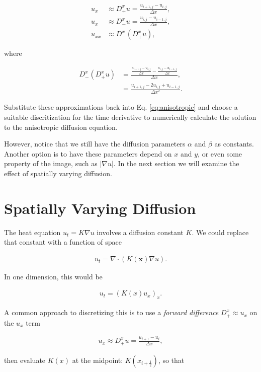 \documentclass[11pt,a4paper,noindent]{article}
\begin{document}
\begin{align}
u_x &\approx D_+^x u = \frac{u_{i+1,j}-u_{i,j}}{\Delta x}, \\
u_x &\approx D_-^x u = \frac{u_{i,j}-u_{i-1,j}}{\Delta x}, \\
u_{xx} &\approx D_-^x (D_+^x u), 
\end{align}

where 

\begin{align}
 D_-^x (D_+^x u) &= \frac{\frac{u_{i+1,j}-u_{i,j}}{\Delta x} - \frac{u_{i,j}-u_{i-1,j}}{\Delta x}}{\Delta x}, \\
 &= \frac{u_{i+1,j}-2u_{i,j} +u_{i-1,j}}{\Delta x^2}.
\end{align}

Substitute these approximations back into Eq. \ref{eq:anisotropic} and choose a suitable discritization for the time derivative to numerically calculate the solution to the anisotropic diffusion equation.

However, notice that we still have the diffusion parameters $\alpha$ and $\beta$ as constants. Another option is to have these parameters depend on $x$ and $y$, or even some property of the image, such as $|\nabla u|$. In the next section we will examine the effect of spatially varying diffusion.

\section{Spatially Varying Diffusion}

The heat equation $u_t = K \nabla u$ involves a diffusion constant $K$. We could replace that constant with a function of space

\begin{align}
u_t = \nabla \cdot (K(\mathbf{x}) \nabla u).
\end{align}

In one dimension, this would be

\begin{align}
u_t = (K(x) u_x)_x.
\end{align}

A common approach to discretizing this is to use a \emph{forward difference} $D_+^x \approx u_x$ on the $u_x$ term

\begin{align}
u_x \approx D_+^x u = \frac{u_{i+1}-u_{i}}{\Delta x},
\end{align}

then evaluate $K(x)$ at the midpoint: $K(x_{i+\frac{1}{2}})$, so that
\end{document}
